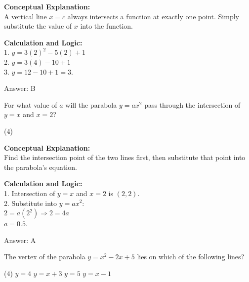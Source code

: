 \documentclass[11pt,paper=a4,answers]{exam}
\begin{document}
\begin{questions}
\begin{solution}
\textbf{Conceptual Explanation:} \\
A vertical line $x = c$ always intersects a function at exactly one point. Simply substitute the value of $x$ into the function.

\vspace{20pt}

\textbf{Calculation and Logic:} \\
1. $y = 3(2)^2 - 5(2) + 1$ \\
2. $y = 3(4) - 10 + 1$ \\
3. $y = 12 - 10 + 1 = 3$.

\vspace{25pt}

Answer: \colorbox{yellow!100}{B}
\end{solution}

\vspace{40pt}

\question
For what value of $a$ will the parabola $y = ax^2$ pass through the intersection of $y = x$ and $x = 2$?
\begin{tasks}(4)
\end{tasks}

\begin{solution}
\textbf{Conceptual Explanation:} \\
Find the intersection point of the two lines first, then substitute that point into the parabola's equation.

\vspace{20pt}

\textbf{Calculation and Logic:} \\
1. Intersection of $y=x$ and $x=2$ is $(2, 2)$. \\
2. Substitute into $y = ax^2$: \\
   $2 = a(2^2) \Rightarrow 2 = 4a$ \\
   $a = 0.5$.

\vspace{25pt}

Answer: \colorbox{yellow!100}{A}
\end{solution}

\vspace{40pt}

\question
The vertex of the parabola $y = x^2 - 2x + 5$ lies on which of the following lines?
\begin{tasks}(4)
    \task $y = 4$
    \task $y = x + 3$
    \task $y = 5$
    \task $y = x - 1$
\end{tasks}


\end{questions}
\end{document}
